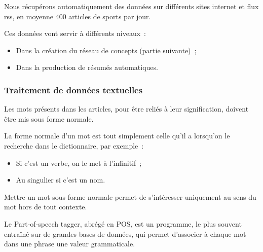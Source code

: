 \documentclass[a4paper, 12pt]{article}
\begin{document}
Nous récupérons automatiquement des données sur différents sites internet et flux rss, en moyenne 400 articles de sports par jour.

Ces données vont servir à différents niveaux~:
\begin{itemize}
 \item Dans la création du réseau de concepts (partie suivante)~;
 \item Dans la production de résumés automatiques.
\end{itemize}



\subsubsection{Traitement de données textuelles}

Les mots présents dans les articles, pour être reliés à leur signification, doivent être mis sous forme normale.

\begin{definition}
La forme normale d'un mot est tout simplement celle qu'il a lorsqu'on le recherche dans le dictionnaire, par exemple~:
\begin{itemize}
 \item Si c'est un verbe, on le met à l'infinitif~;
 \item Au singulier si c'est un nom.
\end{itemize}
Mettre un mot sous forme normale permet de s'intéresser uniquement au sens du mot hors de tout contexte.
\end{definition}


\begin{definition}
Le Part-of-speech tagger, abrégé en POS, est un programme, le plus souvent entraîné sur de grandes bases de données, qui permet d'associer à chaque mot dans une phrase une valeur grammaticale.
\end{definition}
\end{document}
